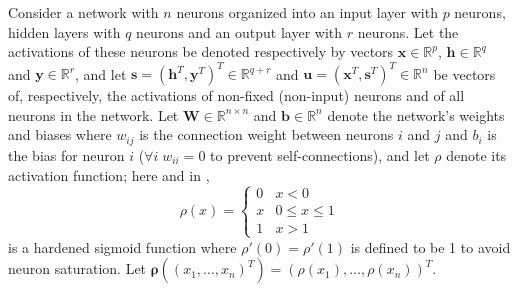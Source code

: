 \documentclass[utf8]{frontiersSCNS}
\newcommand{\mtx}[1]{\bm{#1}}
\begin{document}
Consider a network with $n$ neurons organized into an input layer with $p$ neurons, hidden layers with $q$ neurons and an output layer with $r$ neurons. Let the activations of these neurons be denoted respectively by vectors $\mtx{x}\in\mathbb{R}^{p}$, $\mtx{h}\in\mathbb{R}^{q}$ and $\mtx{y}\in\mathbb{R}^{r}$, and let $\mtx{s}=(\mtx{h}^{T},\mtx{y}^{T})^{T}\in\mathbb{R}^{q+r}$ and $\mtx{u}=(\mtx{x}^{T}, \mtx{s}^{T})^{T}\in\mathbb{R}^{n}$ be vectors of, respectively, the activations of non-fixed (non-input) neurons and of all neurons in the network. Let $\mtx{W}\in\mathbb{R}^{n\times n}$ and $\mtx{b}\in\mathbb{R}^{n}$ denote the network's weights and biases where $w_{ij}$ is the connection weight between neurons $i$ and $j$ and $b_i$ is the bias for neuron $i$ ($\forall i \;w_{ii}=0$ to prevent self-connections), and let $\rho$ denote its activation function; here and in \citep{scellier17},
\begin{equation}
\rho(x)=\begin{cases}0&x<0\\x&0\leq x\leq 1\\1&x>1\end{cases} \label{eqn:hardened_sigmoid}
\end{equation}
 is a hardened sigmoid function
where $\rho'(0)=\rho'(1)$ is defined to be 1 to avoid neuron saturation. Let $\mtx{\rho}((x_1,\hdots, x_n)^T)=(\rho(x_1),\hdots,\rho(x_n))^T$.
\end{document}
